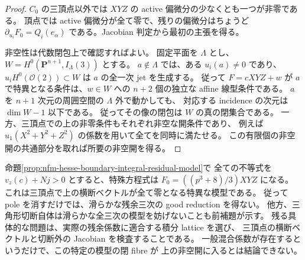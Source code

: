 \begin{proof}
$C_0$ の三頂点以外では $XYZ$ の active 偏微分の少なくとも一つが非零である。
頂点では active 偏微分が全て零で、残りの偏微分はちょうど
$\partial_{u_i}F_0=Q_i(e_\alpha)$ である。Jacobian 判定から最初の主張を得る。

非空性は代数閉包上で確認すればよい。
固定平面を $\Lambda$ とし、$W=H^0(\mathbf P^{n+1},I_\Lambda(3))$ とする。
$a\notin\Lambda$ では、ある $u_i(a)\ne0$ であり、
$u_i H^0(\mathcal O(2))\subset W$ は $a$ の全一次 jet を生成する。
従って $F=cXYZ+w$ が $a$ で特異となる条件は、$w\in W$ への
$n+2$ 個の独立な affine 線型条件である。
$a$ を $n+1$ 次元の周囲空間の $\Lambda$ 外で動かしても、
対応する incidence の次元は $\dim W-1$ 以下である。
従ってその像の閉包は $W$ の真の閉集合である。
一方、三頂点での上の非零条件もそれぞれ非空な開条件であり、
例えば $u_1(X^2+Y^2+Z^2)$ の係数を用いて全てを同時に満たせる。
この有限個の非空開の共通部分を取れば所要の非空開を得る。
\end{proof}

\begin{remark}[積分模型と滑らかな残余模型の差]
命題\ref{prop:nfm-hesse-boundary-integral-residual-model}で
全ての不等式を $v_z(c)+Nj>0$ とすると、特殊方程式は
$F_0=((p^3+8)/3)XYZ$ になる。
これは三頂点で上の横断ベクトルが全て零となる特異な模型である。
従って pole を消すだけでは、滑らかな残余三次の good reduction を得ない。
他方、三角形切断自体は滑らかな全三次の模型を妨げないことも前補題が示す。
残る具体的な問題は、実際の残余係数に適合する積分 lattice を選び、
三頂点の横断ベクトルと切断外の Jacobian を検査することである。
一般混合係数が存在するというだけで、この特定の模型の閉 fibre が
上の非空開に入るとは結論できない。
\end{remark}

